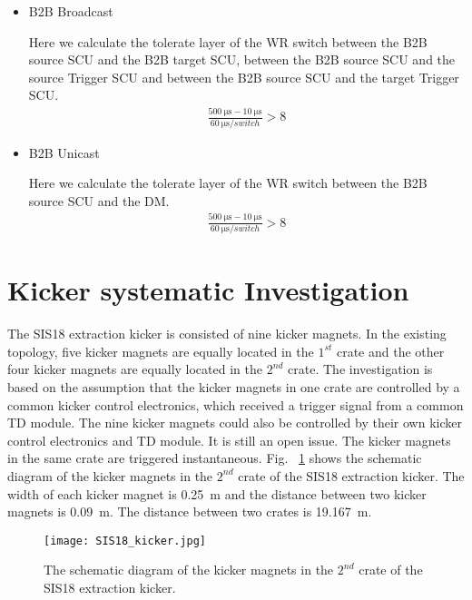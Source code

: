 \begin{itemize}
    \item B2B Broadcast

		Here we calculate the tolerate layer of the WR switch between the B2B source \gls{SCU} and the B2B target SCU, between the B2B source SCU and the source Trigger SCU and between the B2B source SCU and the target Trigger SCU.  
		\begin{equation}
		\begin{aligned}
			\frac{\SI{500}{\us}-\SI{10}{\us}}{\SI{60}{\us/switch}}> 8
		\label {num_switch_b}
		\end{aligned}
		\end{equation}
	\item B2B Unicast

		Here we calculate the tolerate layer of the WR switch between the B2B source SCU and the DM.
		\begin{equation}
		\begin{aligned}
			\frac{\SI{500}{\us}-\SI{10}{\us}}{\SI{60}{\us/switch}}> 8
		\label {num_switch_b}
		\end{aligned}
		\end{equation}
\end{itemize}

\section{Kicker systematic Investigation}
The SIS18 extraction kicker is consisted of nine kicker magnets. In the existing topology, five kicker magnets are equally located in the $1^{st}$ crate and the other four kicker magnets are equally located in the $2^{nd}$ crate. The investigation is based on the assumption that the kicker magnets in one crate are controlled by a common kicker control electronics, which received a trigger signal from a common TD module. The nine kicker magnets could also be controlled by their own kicker control electronics and TD module. It is still an open issue. The kicker magnets in the same crate are triggered instantaneous. Fig. ~\ref{SIS18_kicker} shows the schematic diagram of the kicker magnets in the $2^{nd}$ crate of the SIS18 extraction kicker. The width of each kicker magnet is \SI{0.25}{m} and the distance between two kicker magnets is \SI{0.09}{m}. The distance between two crates is \SI{19.167}{m}. 
\begin{figure}[H]
   \centering   
   \texttt{[image: SIS18\_kicker.jpg]}
   \caption{The schematic diagram of the kicker magnets in the $2^{nd}$ crate of the SIS18 extraction kicker.}
   \label{SIS18_kicker}
\end{figure}

